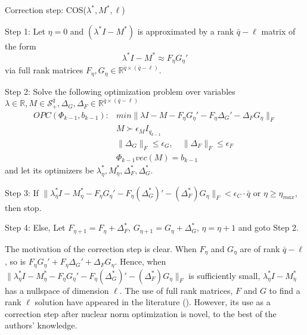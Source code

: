 \documentclass[onecolumn,reviewcopy]{autart}
\def \S{\mathcal{S}}
\begin{document}
Correction step: COS($\lambda^*, M^*,\ell$)
\begin{description}
  \item Step 1: Let $\eta=0$ and $(\lambda^* I - M^*)$ is approximated by a rank $\bar{q}-\ell$ matrix of the form
 $$\lambda^* I - M^* \approx F_\eta G_\eta'$$
via full rank matrices $F_\eta, G_\eta \in \mathbb{R}^{\bar{q} \times (\bar{q}-\ell)}$.
  \item Step 2: Solve the following optimization problem over variables $\lambda \in \mathbb{R}, M \in \S^{\bar{q}}_+, \Delta_G, \Delta_F \in \mathbb{R}^{\bar{q} \times (\bar{q}-\ell)}$%
\begin{subequations}\label{eqn:nuclearnorm3}
\begin{align}
OPC(\Phi_{k-1}, b_{k-1}): &min \|\lambda I - M - F_\eta G_\eta' - F_\eta \Delta_G' - \Delta_F G_\eta \|_F \label{eqn:minnuclear3}\\
&M \succ \epsilon_M I_{q_{k-1}} \label{eqn:Mepsilon3}\\
&\|\Delta_G\|_F \le \epsilon_G, \quad  \|\Delta_F\|_F \le \epsilon_F \label{eqn:DeltaG}\\
&\Phi_{k-1} vec(M) = b_{k-1} \label{eqn:Phi3}
\end{align}
\end{subequations}
\indent \indent and let its optimizers be $\lambda_\eta^*, M_\eta^*, \Delta_F^*, \Delta_G^*$.
  \item Step 3:  If $\|\lambda_\eta^* I - M_\eta^* - F_\eta G_\eta' - F_\eta (\Delta_G^*)' - (\Delta_F^*) G_\eta\|_F < \epsilon_C \cdot \bar{q}$ or $\eta \ge \eta_{max}$, then stop.
  \item Step 4:  Else, Let $F_{\eta+1}=F_\eta + \Delta_F^*$, $G_{\eta+1}=G_\eta + \Delta_G^*$, $\eta=\eta+1$ and goto Step 2.
\end{description}
The motivation of the correction step is clear. When $F_\eta$ and  $G_\eta$ are of rank ${\bar{q}-\ell}$, so is $F_\eta G_\eta' + F_\eta \Delta_G' + \Delta_F G_\eta$. Hence, when $\|\lambda_\eta^* I - M_\eta^* - F_\eta G_\eta' - F_\eta (\Delta_G^*)' - (\Delta_F^*) G_\eta\|_F $ is sufficiently small, $\lambda_\eta^* I - M_\eta^*$ has a nullspace of dimension $\ell$. The use of full rank matrices, $F$ and $G$ to find a rank $\ell$ solution have appeared in the literature (\cite{INP:FHB04}). However, its use as a correction step after nuclear norm optimization is novel, to the best of the authors' knowledge.
\end{document}
